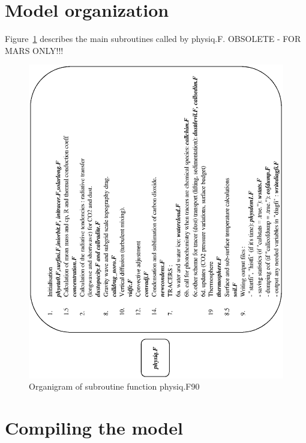 \section{Model organization}
Figure~\ref{fg:organi_phys} describes the main subroutines called by physiq.F. OBSOLETE - FOR MARS ONLY!!!
\begin{figure}
\begin{flushleft}
\includegraphics[scale=0.70,angle=-90]{Fig/physique.eps}
\caption{Organigram of subroutine function physiq.F90}
\label{fg:organi_phys}
\end{flushleft}
\end{figure}



\section{Compiling the model}

